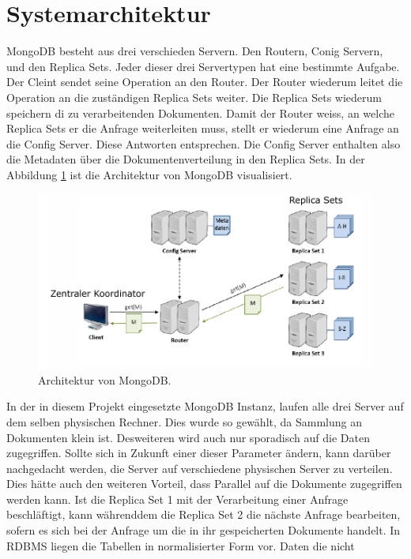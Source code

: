  \section{Systemarchitektur}
 MongoDB besteht aus drei verschieden Servern. Den Routern, Conig Servern, und
 den Replica Sets. Jeder dieser drei Servertypen hat eine bestimmte Aufgabe.
 Der Cleint sendet seine Operation an den Router. Der Router wiederum leitet
 die Operation an die zuständigen Replica Sets weiter. Die Replica Sets wiederum 
 speichern di zu verarbeitenden Dokumenten. Damit der Router weiss, an welche
 Replica Sets er die Anfrage weiterleiten muss, stellt er wiederum eine Anfrage
 an die Config Server. Diese Antworten entsprechen. Die Config Server enthalten 
 also die Metadaten über die Dokumentenverteilung in den Replica Sets.
 In der Abbildung \ref{fig:archmong} ist die Architektur von MongoDB
 visualisiert.
  \begin{figure}[htbp]
  \centering
     \includegraphics[width=1\textwidth]{./pictures/Architektur_MongoDB.png}
  \caption{Architektur von MongoDB. \cite{Kaufmann2016_DB}}
  \label{fig:archmong}
\end{figure}
 In der in diesem Projekt eingesetzte MongoDB Instanz, laufen alle drei Server
 auf dem selben physischen Rechner. Dies wurde so gewählt, da Sammlung an
 Dokumenten klein ist. Desweiteren wird auch nur sporadisch auf die Daten
 zugegriffen. Sollte sich in Zukunft einer dieser Parameter ändern, kann darüber
 nachgedacht werden, die Server auf verschiedene physischen Server zu
 verteilen. Dies hätte auch den weiteren Vorteil, dass Parallel auf die
 Dokumente zugegriffen werden kann. Ist die Replica Set 1 mit der Verarbeitung
 einer Anfrage beschläftigt, kann währenddem die Replica Set 2 die nächste
 Anfrage bearbeiten, sofern es sich bei der Anfrage um die in ihr gespeicherten
 Dokumente handelt.
 In RDBMS liegen die Tabellen in normalisierter Form vor. Daten die nicht
